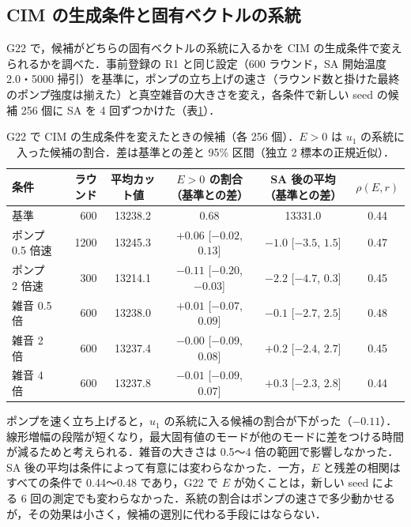 \subsection{CIM の生成条件と固有ベクトルの系統}

G22 で，候補がどちらの固有ベクトルの系統に入るかを CIM の生成条件で変えられるかを調べた．事前登録の R1 と同じ設定（600 ラウンド，SA 開始温度 2.0・5000 掃引）を基準に，ポンプの立ち上げの速さ（ラウンド数と掛けた最終のポンプ強度は揃えた）と真空雑音の大きさを変え，各条件で新しい seed の候補 256 個に SA を 4 回ずつかけた（表\ref{tab:lineage}）．

\begin{table}[t]
\centering
\caption{G22 で CIM の生成条件を変えたときの候補（各 256 個）．$E>0$ は $u_1$ の系統に入った候補の割合．差は基準との差と 95\% 区間（独立 2 標本の正規近似）．}\label{tab:lineage}
\small
\begin{tabular}{lrcccc}
\toprule
条件 & ラウンド & 平均カット値 & $E>0$ の割合（基準との差） & SA 後の平均（基準との差） & $\rho(E, r)$ \\
\midrule
基準 & 600 & 13238.2 & 0.68 & 13331.0 & 0.44 \\
ポンプ 0.5 倍速 & 1200 & 13245.3 & $+0.06$ [$-0.02$, $0.13$] & $-1.0$ [$-3.5$, $1.5$] & 0.47 \\
ポンプ 2 倍速 & 300 & 13214.1 & $-0.11$ [$-0.20$, $-0.03$] & $-2.2$ [$-4.7$, $0.3$] & 0.45 \\
雑音 0.5 倍 & 600 & 13238.0 & $+0.01$ [$-0.07$, $0.09$] & $-0.1$ [$-2.7$, $2.5$] & 0.48 \\
雑音 2 倍 & 600 & 13237.4 & $-0.00$ [$-0.09$, $0.08$] & $+0.2$ [$-2.4$, $2.7$] & 0.45 \\
雑音 4 倍 & 600 & 13237.8 & $-0.01$ [$-0.09$, $0.07$] & $+0.3$ [$-2.3$, $2.8$] & 0.44 \\
\bottomrule
\end{tabular}
\end{table}

ポンプを速く立ち上げると，$u_1$ の系統に入る候補の割合が下がった（$-0.11$）．線形増幅の段階が短くなり，最大固有値のモードが他のモードに差をつける時間が減るためと考えられる．雑音の大きさは 0.5〜4 倍の範囲で影響しなかった．SA 後の平均は条件によって有意には変わらなかった．一方，$E$ と残差の相関はすべての条件で 0.44〜0.48 であり，G22 で $E$ が効くことは，新しい seed による 6 回の測定でも変わらなかった．系統の割合はポンプの速さで多少動かせるが，その効果は小さく，候補の選別に代わる手段にはならない．
